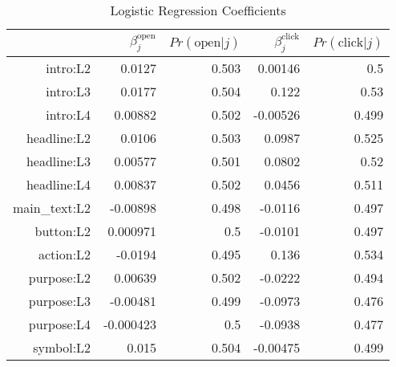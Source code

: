 \begin{table}[ht]
\centering
\caption{Logistic Regression Coefficients} 
\label{tab:logit_results}
\begin{tabular}{rrrrr}
  \hline
 & $\beta_j^{\text{open}}$ & $Pr(\text{open}|j)$ & $\beta_j^{\text{click}}$ & $Pr(\text{click}|j)$ \\ 
  \hline
\textsf{intro:L2} & 0.0127 & 0.503 & 0.00146 &  0.5 \\ 
  \textsf{intro:L3} & 0.0177 & 0.504 & 0.122 & 0.53 \\ 
  \textsf{intro:L4} & 0.00882 & 0.502 & -0.00526 & 0.499 \\ 
  \textsf{headline:L2} & 0.0106 & 0.503 & 0.0987 & 0.525 \\ 
  \textsf{headline:L3} & 0.00577 & 0.501 & 0.0802 & 0.52 \\ 
  \textsf{headline:L4} & 0.00837 & 0.502 & 0.0456 & 0.511 \\ 
  \textsf{main_text:L2} & -0.00898 & 0.498 & -0.0116 & 0.497 \\ 
  \textsf{button:L2} & 0.000971 &  0.5 & -0.0101 & 0.497 \\ 
  \textsf{action:L2} & -0.0194 & 0.495 & 0.136 & 0.534 \\ 
  \textsf{purpose:L2} & 0.00639 & 0.502 & -0.0222 & 0.494 \\ 
  \textsf{purpose:L3} & -0.00481 & 0.499 & -0.0973 & 0.476 \\ 
  \textsf{purpose:L4} & -0.000423 &  0.5 & -0.0938 & 0.477 \\ 
  \textsf{symbol:L2} & 0.015 & 0.504 & -0.00475 & 0.499 \\ 
   \hline
\end{tabular}
\end{table}
